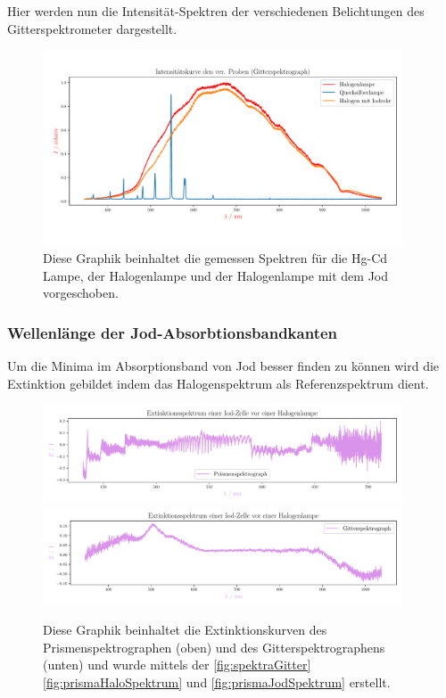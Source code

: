 \documentclass[12pt,english,ngerman]{scrartcl}
\begin{document}
Hier werden nun die Intensität-Spektren der verschiedenen Belichtungen des
Gitterspektrometer dargestellt.

\begin{figure}[H]
	\begin{center}
		\includegraphics[width=0.95\textwidth]{figures/intensity_spektrum_gitter.pdf}
	\end{center}
	\caption{Diese Graphik beinhaltet die gemessen Spektren für die Hg-Cd Lampe,
		der Halogenlampe und der Halogenlampe mit dem Jod vorgeschoben.
	}\label{fig:spektraGitter}
\end{figure}

\subsubsection{Wellenlänge der Jod-Absorbtionsbandkanten}
Um die Minima im Absorptionsband von Jod besser finden zu können wird die
Extinktion gebildet indem das Halogenspektrum als Referenzspektrum dient. 

\begin{figure}[H]
	\begin{center}
		\includegraphics[width=0.95\textwidth]{figures/prism_extinction.pdf}
		\includegraphics[width=0.95\textwidth]{figures/gitter_extinction.pdf}
	\end{center}
	\caption{Diese Graphik beinhaltet die Extinktionskurven des Prismenspektrographen
		(oben) und des Gitterspektrographens (unten) und wurde mittels der 
		\autoref{fig:spektraGitter} \autoref{fig:prismaHaloSpektrum} und 
		\autoref{fig:prismaJodSpektrum} erstellt.
	}\label{fig:extinktionkurven}
\end{figure}
\end{document}

